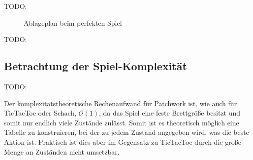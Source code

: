 TODO:

\begin{figure}[!ht]
    \centering
    \caption{Ablageplan beim perfekten Spiel}
    \label{fig:max-score-quilt-board}
\end{figure}

TODO:

\subsection*{Betrachtung der Spiel-Komplexität}

TODO:








Der komplexitätstheoretische Rechenaufwand für Patchwork ist, wie auch für TicTacToe oder Schach, $\mathcal{O}(1)$, da das Spiel eine feste Brettgröße besitzt und somit nur endlich viele Zustände zulässt. Somit ist es theoretisch möglich eine Tabelle zu konstruieren, bei der zu jedem Zustand angegeben wird, was die beste Aktion ist. Praktisch ist dies aber im Gegensatz zu TicTacToe durch die große Menge an Zuständen nicht umsetzbar.

